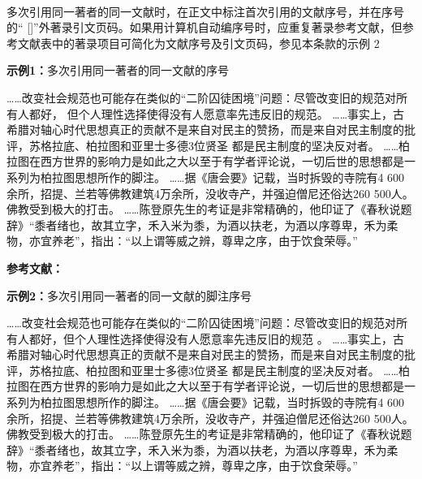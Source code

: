 \documentclass[twoside]{article}%
\begin{document}
\paragraph{}\label{sec:numeric:multic} 多次引用同一著者的同一文献时，在正文中标注首次引用的文献序号，并在序号的“ []”外著录引文页码。如果用计算机自动编序号时，应重复著录参考文献，但参考文献表中的著录项目可简化为文献序号及引文页码，参见本条款的示例 2

\begin{refsection}
\textbf{示例1：}多次引用同一著者的同一文献的序号

……改变社会规范也可能存在类似的“二阶囚徒困境”问题：尽管改变旧的规范对所有人都好，
但个人理性选择使得没有人愿意率先违反旧的规范\cite{Sunstein1996-903-903}。
……事实上，古希腊对轴心时代思想真正的贡献不是来自对民主的赞扬，而是来自对民主制度的批评，苏格拉底、柏拉图和亚里士多德3位贤圣
都是民主制度的坚决反对者。
……柏拉图在西方世界的影响力是如此之大以至于有学者评论说，一切后世的思想都是一系列为柏拉图思想所作的脚注\cite{罗杰斯2011-15-16}。
……据《唐会要》记载，当时拆毁的寺院有4 600余所，招提、兰若等佛教建筑4万余所，没收寺产，并强迫僧尼还俗达260 500人。
佛教受到极大的打击。
……陈登原先生的考证是非常精确的，他印证了《春秋说题辞》“黍者绪也，故其立字，禾入米为黍，为酒以扶老，为酒以序尊卑，禾为柔物，亦宜养老”，指出：“以上谓等威之辨，尊卑之序，由于饮食荣辱。”\cite{陈登原2000-29-29}

\textbf{参考文献：}

\printbibliography[heading=none,env=indentegenv]
\end{refsection}

\begin{refsection}
\textbf{示例2：}多次引用同一著者的同一文献的脚注序号

\renewcommand{\thempfootnote}{\arabic{mpfootnote}}
\smallskip\noindent\begin{minipage}{\textwidth}\renewcommand{\thempfootnote}{\arabic{mpfootnote}}
\hspace{2em}……改变社会规范也可能存在类似的“二阶囚徒困境”问题：尽管改变旧的规范对所有人都好，但个人理性选择使得没有人愿意率先违反旧的规范
。
……事实上，古希腊对轴心时代思想真正的贡献不是来自对民主的赞扬，而是来自对民主制度的批评，苏格拉底、柏拉图和亚里士多德3位贤圣
都是民主制度的坚决反对者。
……柏拉图在西方世界的影响力是如此之大以至于有学者评论说，一切后世的思想都是一系列为柏拉图思想所作的脚注。
……据《唐会要》记载，当时拆毁的寺院有4 600余所，招提、兰若等佛教建筑4万余所，没收寺产，并强迫僧尼还俗达260 500人。
佛教受到极大的打击。
……陈登原先生的考证是非常精确的，他印证了《春秋说题辞》“黍者绪也，故其立字，禾入米为黍，为酒以扶老，为酒以序尊卑，禾为柔物，亦宜养老”，指出：“以上谓等威之辨，尊卑之序，由于饮食荣辱。”
\end{minipage}
\end{refsection}
\end{document}
